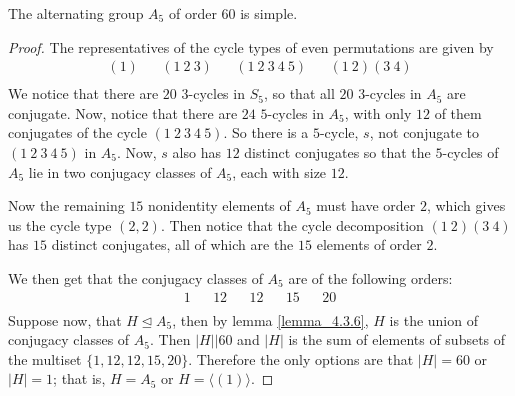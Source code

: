 \begin{theorem}\label{theorem_4.3.7}
  The alternating group $A_5$ of order $60$ is simple.
\end{theorem}
\begin{proof}
  The representatives of the cycle types of even permutations are given by
  \begin{align*}
    (1) && (1 \ 2 \ 3) && (1 \ 2 \ 3 \ 4 \ 5) && (1 \ 2)(3 \ 4)     \\
  \end{align*}
  We notice that there are $20$  $3$-cycles in $S_5$, so that all $20$
  $3$-cycles in  $A_5$ are conjugate. Now, notice that there are $24$
  $5$-cycles in $A_5$, with only $12$ of them conjugates of the cycle  $(1 \ 2
  \ 3 \ 4 \ 5)$. So there is a $5$-cycle, $s$, not conjugate to $(1 \ 2 \ 3 \
  4 \ 5)$ in $A_5$. Now, $s$ also has  $12$ distinct conjugates so that the
  $5$-cycles of  $A_5$ lie in two conjugacy classes of  $A_5$, each with size
  $12$.

  Now the remaining $15$ nonidentity elements of  $A_5$ must have order $2$,
  which gives us the cycle type  $(2,2)$. Then notice that the cycle
  decomposition $(1 \ 2)(3 \ 4)$ has $15$ distinct conjugates, all of which
  are the  $15$ elements of order  $2$.

  We then get that the conjugacy classes of  $A_5$ are of the following
  orders:
  \begin{align*}
    1  &&  12  &&  12  &&  15  &&  20  \\
  \end{align*}
  Suppose now, that $H \unlhd A_5$, then by lemma \ref{lemma_4.3.6}, $H$ is the
  union of conjugacy classes of  $A_5$. Then $|H||60$ and $|H|$ is
  the sum of elements of subsets of the multiset $\{1, 12, 12, 15, 20\}$.
  Therefore the only options are that $|H|=60$ or $|H|=1$; that is,
  $H=A_5$ or $H=\langle (1) \rangle$.
\end{proof}
